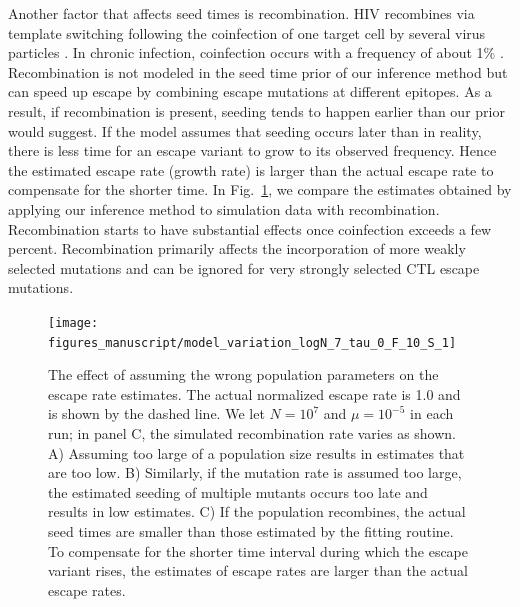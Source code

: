 \documentclass{frontiers}
\newcommand{\FIG}[1]{Fig.~\ref{fig:#1}}
\begin{document}
Another factor that affects seed times is recombination. HIV recombines
via template switching following the coinfection of one target cell by
several virus particles \citep{Levy:2004p23309}. In chronic infection,
coinfection occurs with a frequency of about 1\%
\citep{Neher:2010p32691,Batorsky:2011p40107}. Recombination is not
modeled in the seed time prior of our inference method but can speed up
escape by combining escape mutations at different epitopes. As a result,
if recombination is present, seeding tends to happen earlier than our
prior would suggest. If the model assumes that seeding occurs later than in reality,
there is less time for an escape variant to grow to its observed
frequency. Hence the estimated escape rate (growth rate) is larger than
the actual escape rate to compensate for the shorter time.  In
\FIG{modeldeviation}, we compare the estimates obtained by applying our
inference method to simulation data with recombination. Recombination
starts to have substantial effects once coinfection exceeds a few
percent. Recombination primarily affects the incorporation of more
weakly selected mutations and can be ignored for very strongly selected
CTL escape mutations.

\begin{figure}[htp]
\begin{center}
  \texttt{[image: figures\_manuscript/model\_variation\_logN\_7\_tau\_0\_F\_10\_S\_1]}
  \caption[labelInTOC]{The effect of assuming the wrong population parameters
  on the escape rate estimates. The actual 
  normalized escape rate is 1.0 and is shown by the dashed line. We let $N = 10^7$ and $\mu=10^{-5}$ in each run;
 in panel C, the simulated recombination rate varies as shown.
  A) Assuming too large of a population size
  results in estimates that are too low. B) Similarly, if the mutation rate is
  assumed too large, the estimated seeding of multiple mutants occurs too late
  and results in low estimates.
  C) If the population recombines, the actual seed times are smaller
  than those estimated by the fitting routine. To compensate for the
  shorter time interval during which the escape variant rises, the
  estimates of escape rates are larger than the actual escape rates.  }
  \label{fig:modeldeviation}
\end{center}
\end{figure}
\end{document}
